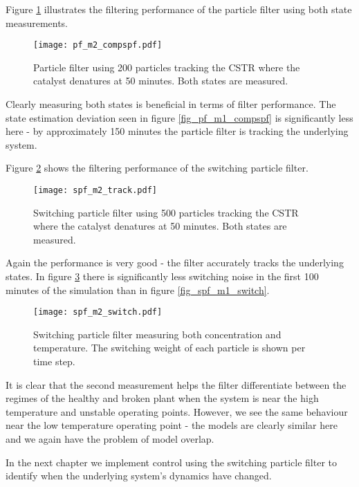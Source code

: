 Figure \ref{fig_pf_m2_compspf} illustrates the filtering performance of the particle filter using both state measurements.
\begin{figure}[H] 
\centering
\texttt{[image: pf\_m2\_compspf.pdf]}
\caption{Particle filter using 200 particles tracking the CSTR where the catalyst denatures at 50 minutes. Both states are measured.}
\label{fig_pf_m2_compspf}
\end{figure}
Clearly measuring both states is beneficial in terms of filter performance. The state estimation deviation seen in figure \ref{fig_pf_m1_compspf} is significantly less here - by approximately 150 minutes the particle filter is tracking the underlying system.

Figure \ref{fig_spf_m2_track} shows the filtering performance of the switching particle filter. 
\begin{figure}[H] 
\centering
\texttt{[image: spf\_m2\_track.pdf]}
\caption{Switching particle filter using 500 particles tracking the CSTR where the catalyst denatures at 50 minutes. Both states are measured.}
\label{fig_spf_m2_track}
\end{figure}
Again the performance is very good - the filter accurately tracks the underlying states. In figure \ref{fig_spf_m2_switch} there is significantly less switching noise in the first 100 minutes of the simulation than in figure \ref{fig_spf_m1_switch}.
\begin{figure}[H] 
\centering
\texttt{[image: spf\_m2\_switch.pdf]}
\caption{Switching particle filter measuring both concentration and temperature. The switching weight of each particle is shown per time step.}
\label{fig_spf_m2_switch}
\end{figure} 
It is clear that the second measurement helps the filter differentiate between the regimes of the healthy and broken plant when the system is near the high temperature and unstable operating points. However, we see the same behaviour near the low temperature operating point - the models are clearly similar here and we again have the problem of model overlap. 

In the next chapter we implement control using the switching particle filter to identify when the underlying system's dynamics have changed. 
